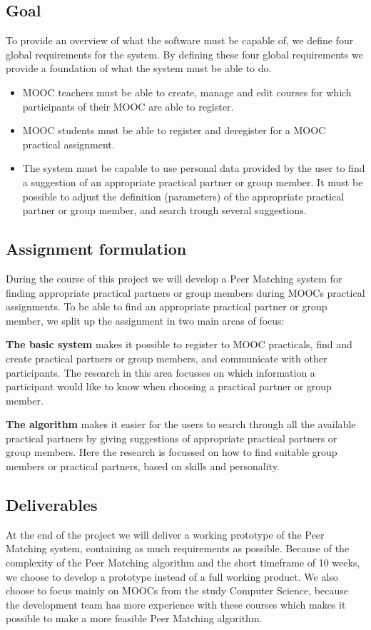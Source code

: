 \subsection*{Goal}
To provide an overview of what the software must be capable of, we define four global requirements for the system.
By defining these four global requirements we provide a foundation of what the system must be able to do.
\begin{itemize}
\item MOOC teachers must be able to create, manage and edit courses for which participants of their MOOC are able to register.

\item MOOC students must be able to register and deregister for a MOOC practical assignment.

\item The system must be capable to use personal data provided by the user to find a suggestion of an appropriate practical partner or group member.
It must be possible to adjust the definition (parameters) of the appropriate practical partner or group member, and search trough several suggestions.
\end{itemize}

\subsection*{Assignment formulation}
During the course of this project we will develop a Peer Matching system for finding appropriate practical partners or group members during MOOCs practical assignments.
To be able to find an appropriate practical partner or group member, we split up the assignment in two main areas of focus:

\textbf{The basic system} makes it possible to register to MOOC practicals, find and create practical partners or group members, and communicate with other participants.
The research in this area focusses on which information a participant would like to know when choosing a practical partner or group member.

\textbf{The algorithm} makes it easier for the users to search through all the available practical partners by giving suggestions of appropriate practical partners or group members.
Here the research is focussed on how to find suitable group members or practical partners, based on skills and personality.

\subsection*{Deliverables}
At the end of the project we will deliver a working prototype of the Peer Matching system, containing as much requirements as possible.
Because of the complexity of the Peer Matching algorithm and the short timeframe of 10 weeks, we choose to develop a prototype instead of a full working product.
We also choose to focus mainly on MOOCs from the study Computer Science, because the development team has more experience with these courses which makes it possible to make a more feasible Peer Matching algorithm.

